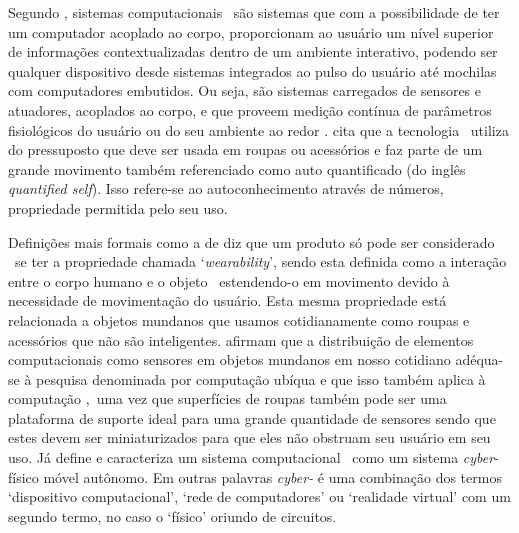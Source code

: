         Segundo \citet{Amorim2017, billinghurst1999wearable}, sistemas computacionais \wearables\ são sistemas que com a possibilidade de ter um computador acoplado ao corpo, proporcionam ao usuário um nível superior de informações contextualizadas dentro de um ambiente interativo, podendo ser qualquer dispositivo desde sistemas integrados ao pulso do usuário até mochilas com computadores embutidos.
        Ou seja, são sistemas carregados de sensores e atuadores, acoplados ao corpo, e que proveem medição contínua de parâmetros fisiológicos do usuário ou do seu ambiente ao redor \citep{son2014multifunctional}.
        \citet{arias2015privacy} cita que a tecnologia \wearable\ utiliza do pressuposto que deve ser usada em roupas ou acessórios e faz parte de um grande movimento também referenciado como auto quantificado (do inglês \textit{quantified self}).
        Isso refere-se ao autoconhecimento através de números, propriedade permitida pelo seu uso.
        
        Definições mais formais como a de \citet{Gemperle1998} diz que um produto só pode ser considerado \wearable\ se ter a propriedade chamada `\textit{wearability}', sendo esta definida como a interação entre o corpo humano e o objeto \wearable\ estendendo-o em movimento devido à necessidade de movimentação do usuário.
        Esta mesma propriedade está relacionada a objetos mundanos que usamos cotidianamente como roupas e acessórios que não são inteligentes.
        \citet{VanLaerhoven2002} afirmam que a distribuição de elementos computacionais como sensores em objetos mundanos em nosso cotidiano adéqua-se à pesquisa denominada por computação ubíqua e que isso também aplica à computação \wearable,\ uma vez que superfícies de roupas também pode ser uma plataforma de suporte ideal para uma grande quantidade de sensores sendo que estes devem ser miniaturizados para que eles não obstruam seu usuário em seu uso.
        Já \citet{Jozwiak2017} define e caracteriza um sistema computacional \wearable\ como um sistema \textit{cyber}-físico móvel autônomo.
        Em outras palavras \textit{cyber-} é uma combinação dos termos `dispositivo computacional', `rede de computadores' ou `realidade virtual' com um segundo termo, no caso o `físico' oriundo de circuitos.
        
        
        
